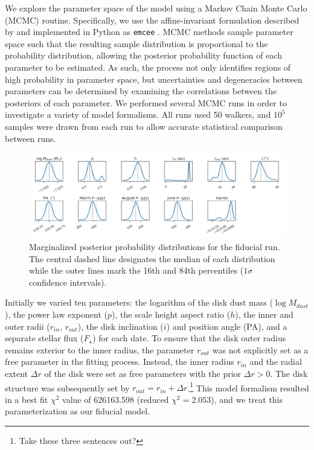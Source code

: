 \documentclass[12pt,oneside]{article}
\begin{document}
We explore the parameter space of the model using a Markov Chain Monte Carlo (MCMC) routine. 
Specifically, we use the affine-invariant formulation described by \cite{goodmanweare10} and implemented in Python as \texttt{emcee} \citep{foreman-mackey13}.  
MCMC methods sample parameter space such that the resulting sample distribution is proportional to the probability distribution, allowing the posterior probability function of each parameter to be estimated. 
As such, the process not only identifies regions of high probability in parameter space, but uncertainties and degeneracies between parameters can be determined by examining the correlations between the posteriors of each parameter. 
We performed several MCMC runs in order to investigate a variety of model formalisms. 
All runs used 50 walkers, and $10^5$ samples were drawn from each run to allow accurate statistical comparison between runs.


\begin{figure}
  \centering
  \includegraphics[width=\linewidth]{figures/fiducial_kde}
  \caption{Marginalized posterior probability distributions for the fiducial run. The central dashed line designates the median of each distribution while the outer lines mark the 16th and 84th percentiles ($1\sigma$ confidence intervals).}
  \label{fig: kde}
\end{figure}

Initially we varied ten parameters: the logarithm of the disk dust mass ($\log M_{dust}$), the power law exponent ($p$), the scale height aspect ratio ($h$), the inner and outer radii ($r_{in}$, $r_{out}$), the disk inclination  ($i$) and position angle (PA), and a separate stellar flux ($F_\star$) for each date. 
To ensure that the disk outer radius remains exterior to the inner radius, the parameter $r_{out}$ was not explicitly set as a free parameter in the fitting process. 
Instead, the inner radius $r_{in}$  and the radial extent $\Delta r$ of the disk were set as free parameters with the prior $\Delta r > 0$. 
The disk structure was subsequently set by $r_{out} = r_{in} + \Delta r$.\footnote{Take these three sentences out?}
This model formalism resulted in a best fit $\chi^2$ value of 626163.598 (reduced $\chi^2=2.053$), and we treat this parameterization as our fiducial model.
\end{document}
